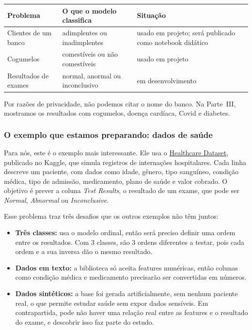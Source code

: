 \documentclass[11pt,a4paper]{article}
\newenvironment{tabela}{\par\nopagebreak[4]\vspace{0.3em}\nopagebreak[4]\begingroup\centering\small}{\par\endgroup\vspace{0.6em}}
\begin{document}
\begin{tabela}
\begin{tabularx}{\linewidth}{>{\raggedright\arraybackslash}p{4.2cm}L>{\raggedright\arraybackslash}p{3.4cm}}
\toprule
Problema & O que o modelo classifica & Situação\\
\midrule
Clientes de um banco & adimplentes ou inadimplentes & usado em projeto; será publicado como notebook didático\\
Cogumelos & comestíveis ou não comestíveis & usado em projeto\\
Resultados de exames & normal, anormal ou inconclusivo & em desenvolvimento\\
\bottomrule
\end{tabularx}
\end{tabela}

Por razões de privacidade, não podemos citar o nome do banco. Na Parte~III, mostramos os resultados com cogumelos, doença cardíaca, Covid e diabetes.

\subsubsection{O exemplo que estamos preparando: dados de saúde}

Para nós, este é o exemplo mais interessante. Ele usa o \href{https://www.kaggle.com/datasets/prasad22/healthcare-dataset}{Healthcare Dataset}, publicado no Kaggle, que simula registros de internações hospitalares. Cada linha descreve um paciente, com dados como idade, gênero, tipo sanguíneo, condição médica, tipo de admissão, medicamento, plano de saúde e valor cobrado. O objetivo é prever a coluna \emph{Test Results}, o resultado de um exame, que pode ser \emph{Normal}, \emph{Abnormal} ou \emph{Inconclusive}.

Esse problema traz três desafios que os outros exemplos não têm juntos:

\begin{itemize}
  \item \textbf{Três classes:} usa o modelo ordinal, então será preciso definir uma ordem entre os resultados. Com 3 classes, são 3 ordens diferentes a testar, pois cada ordem e a sua inversa dão o mesmo resultado.
  \item \textbf{Dados em texto:} a biblioteca só aceita features numéricas, então colunas como condição médica e medicamento precisarão ser convertidas em números.
  \item \textbf{Dados sintéticos:} a base foi gerada artificialmente, sem nenhum paciente real, o que permite estudar saúde sem expor dados sensíveis. Em contrapartida, pode não haver uma relação real entre as features e o resultado do exame, e descobrir isso faz parte do estudo.
\end{itemize}
\end{document}
